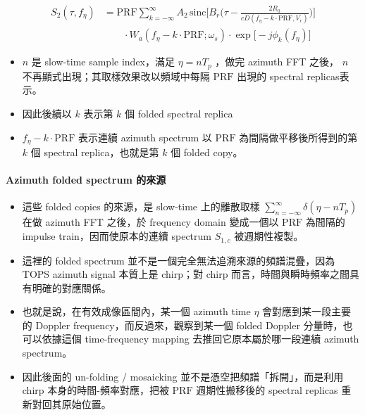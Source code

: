 \documentclass[11pt]{article}
\providecommand{\tightlist}{%
  \setlength{\itemsep}{0pt}\setlength{\parskip}{0pt}}
\begin{document}
\begin{equation}
\begin{aligned}
S_2(\tau,f_\eta)
&=
\mathrm{PRF}\sum_{k=-\infty}^{\infty} A_2\,
\mathrm{sinc}\biggl[ B_r\biggl( \tau-\frac{2R_0}{cD(f_\eta-k\cdot\mathrm{PRF},V_r)} \biggr) \biggr]\\
&\qquad \cdot W_a(f_\eta-k\cdot\mathrm{PRF};\omega_s)
\cdot \exp\biggl[-j\phi_k(f_\eta)\biggr]
\end{aligned}
\end{equation}

\begin{itemize}
\tightlist
\item
  \(n\) 是 slow-time sample index，滿足 \(\eta=nT_p\) ，做完 azimuth FFT
  之後， \(n\) 不再顯式出現；其取樣效果改以頻域中每隔 \(\mathrm{PRF}\)
  出現的 spectral replicas表示。
\item
  因此後續以 \(k\) 表示第 \(k\) 個 folded spectral replica
\item
  \(f_\eta-k\cdot\mathrm{PRF}\) 表示連續 azimuth spectrum 以
  \(\mathrm{PRF}\) 為間隔做平移後所得到的第 \(k\) 個 spectral
  replica，也就是第 \(k\) 個 folded copy。
\end{itemize}

\hypertarget{azimuth-folded-spectrum-ux7684ux4f86ux6e90}{%
\paragraph{Azimuth folded spectrum
的來源}\label{azimuth-folded-spectrum-ux7684ux4f86ux6e90}}

\begin{itemize}
\tightlist
\item
  這些 folded copies 的來源，是 slow-time 上的離散取樣
  \(\sum_{n=-\infty}^{\infty}\delta(\eta-nT_p)\) 在做 azimuth FFT
  之後，於 frequency domain 變成一個以 \(\mathrm{PRF}\) 為間隔的 impulse
  train，因而使原本的連續 spectrum \(S_{1,c}\) 被週期性複製。
\item
  這裡的 folded spectrum 並不是一個完全無法追溯來源的頻譜混疊，因為 TOPS
  azimuth signal 本質上是 chirp；對 chirp
  而言，時間與瞬時頻率之間具有明確的對應關係。
\item
  也就是說，在有效成像區間內，某一個 azimuth time \(\eta\)
  會對應到某一段主要的 Doppler frequency，而反過來，觀察到某一個 folded
  Doppler 分量時，也可以依據這個 time-frequency mapping
  去推回它原本屬於哪一段連續 azimuth spectrum。
\item
  因此後面的 un-folding / mosaicking 並不是憑空把頻譜「拆開」，而是利用
  chirp 本身的時間-頻率對應，把被 \(\mathrm{PRF}\) 週期性搬移後的
  spectral replicas 重新對回其原始位置。
\end{itemize}
\end{document}

